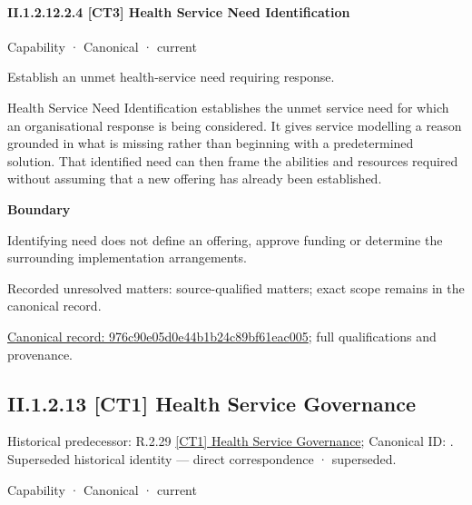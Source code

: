 \paragraph*{II.1.2.12.2.4 [CT3] Health Service Need Identification}
\label{navigation:II.1.2.12.2.4}

\label{element:976c90e05d0e44b1b24c89bf61eac005}
{\small Capability · Canonical · current}\par

Establish an unmet health-service need requiring response.



Health Service Need Identification establishes the unmet service need for which an organisational response is being considered. It gives service modelling a reason grounded in what is missing rather than beginning with a predetermined solution. That identified need can then frame the abilities and resources required without assuming that a new offering has already been established.



\textbf{Boundary}



Identifying need does not define an offering, approve funding or determine the surrounding implementation arrangements.


{\small Recorded unresolved matters: source-qualified matters; exact scope remains in the canonical record.}\par
{\footnotesize \href{../../../../continuum/strategy/capability/976c90e05d0e44b1b24c89bf61eac005.md}{Canonical record: 976c90e05d0e44b1b24c89bf61eac005}; full qualifications and provenance.}\par
\subsection*{II.1.2.13 [CT1] Health Service Governance}
\label{navigation:II.1.2.13}

{\small Historical predecessor: R.2.29 \hyperref[element:24f3dd30223142efa35a5826552d53ab]{[CT1] Health Service Governance}; Canonical ID: \texttt{}. Superseded historical identity — direct correspondence · superseded.}\par
\label{element:209aada781e844e28202a2535a264c21}
{\small Capability · Canonical · current}\par

